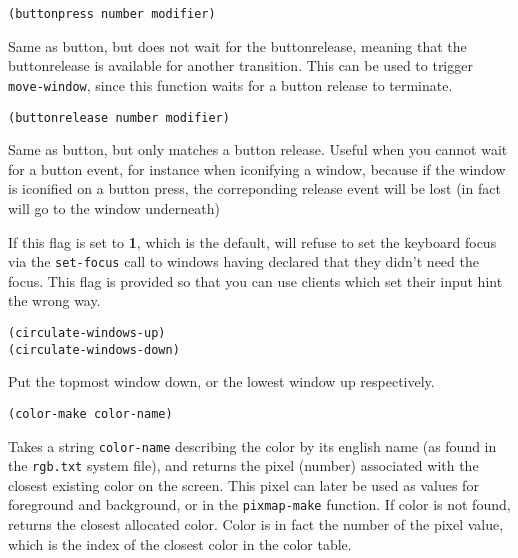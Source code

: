         
{\usagefont\begin{verbatim}
(buttonpress number modifier)
\end{verbatim}}\usageupspace

Same as button, but does not wait for the buttonrelease, meaning that the
buttonrelease is available for another transition.
This can be used to trigger \verb"move-window", since this function waits for
a button release to terminate.

        
{\usagefont\begin{verbatim}
(buttonrelease number modifier)
\end{verbatim}}\usageupspace

Same as button, but only matches a button release. Useful when you cannot
wait for a button event, for instance when iconifying a window, because if
the window is iconified on a button press, the correponding release event
will be lost (in fact will go to the window underneath)

        

If this flag is set to {\bf 1}, which is the default, {\GWM} will refuse to
set the keyboard focus via the \verb"set-focus" call to windows having
declared that they didn't need the focus. This flag is provided so that you
can use clients which set their input hint the wrong way.

        
{\usagefont\begin{verbatim}
(circulate-windows-up)
(circulate-windows-down)
\end{verbatim}}\usageupspace

Put the topmost window down, or the lowest window up respectively.

        
{\usagefont\begin{verbatim}
(color-make color-name)
\end{verbatim}}\usageupspace

Takes a string \verb"color-name" describing the color by its english  name
(as found in the \verb"rgb.txt" system file),
and returns the pixel (number) associated with the closest existing color on
the screen.  This pixel can later be used as values for foreground and
background, or in the \verb"pixmap-make" function.  If color is not found,
returns the closest allocated color. Color is in fact the number of the
pixel value, which is the index of the closest color in the color table.

